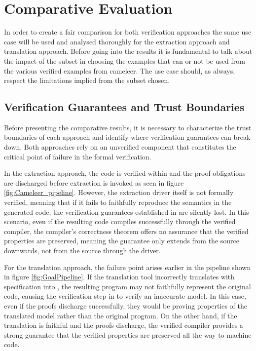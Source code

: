 
%

\chapter{Comparative Evaluation}
\label{cha:Comparative_Evaluation}

In order to create a fair comparison for both verification approaches the same use case will be used and analysed thoroughly for the
extraction approach and translation approach. Before going into the results it is fundamental to talk about the impact of the subset
in choosing the examples that can or not be used from the various verified examples from cameleer. The use case should, as always,
respect the limitations implied from the subset chosen.


\section{Verification Guarantees and Trust Boundaries}
\label{sec:Verification_Guarantees_and_Trust_Boundaries}

Before presenting the comparative results, it is necessary to characterize the trust boundaries of each approach and identify where verification 
guarantees can break down. Both approaches rely on an unverified component that constitutes the critical point of failure in the formal verification.

In the extraction approach, the code is verified within \whythree and the proof obligations are discharged before extraction is invoked as seen in figure \ref{fig:Cameleer_pipeline}. 
However, the extraction driver itself is not formally verified, meaning that if it fails to faithfully reproduce the \whyml semantics in the generated \cml code, 
the verification guarantees established in \whythree are silently lost. In this scenario, even if the resulting \cml code compiles successfully 
through the verified compiler, the compiler's correctness theorem offers no assurance that the verified properties are preserved, meaning the guarantee 
only extends from the \cml source downwards, not from the \whyml source through the driver.

For the translation approach, the failure point arises earlier in the pipeline shown in figure \ref{fig:GoalPipeline}. If the translation tool incorrectly translates \cml with 
\gospel specification into \whyml, the resulting \whyml program may not faithfully represent the original \cml code, causing the verification step in \whythree 
to verify an inaccurate model. In this case, even if the proofs discharge successfully, they would be proving properties of the translated model rather than 
the original program. On the other hand, if the translation is faithful and the proofs discharge, the verified \cml compiler provides a strong guarantee that the 
verified properties are preserved all the way to machine code.

